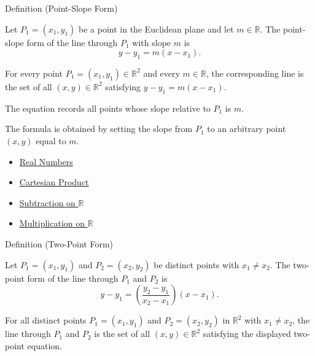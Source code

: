 \begin{definitionbox}{Definition (Point-Slope Form)}
\begin{definition}\label{def:point-slope-form}
Let $P_1=(x_1,y_1)$ be a point in the Euclidean plane and let
$m\in\mathbb{R}$. The point-slope form of the line through $P_1$ with slope
$m$ is
\[
  y-y_1=m(x-x_1).
\]
\end{definition}
\end{definitionbox}

\begin{remark*}
For every point $P_1=(x_1,y_1)\in\mathbb{R}^2$ and every
$m\in\mathbb{R}$, the corresponding line is the set of all
$(x,y)\in\mathbb{R}^2$ satisfying $y-y_1=m(x-x_1)$.
\end{remark*}

\begin{remark*}[Interpretation]
The equation records all points whose slope relative to $P_1$ is $m$.
\end{remark*}

\begin{remark*}[Exposition]
The formula is obtained by setting the slope from $P_1$ to an arbitrary point
$(x,y)$ equal to $m$.
\end{remark*}

\begin{dependencies}
\begin{itemize}
  \item \hyperref[def:reals]{Real Numbers}
  \item \hyperref[def:cartesian-product]{Cartesian Product}
  \item \hyperref[def:subtraction-on-r]{Subtraction on $\mathbb{R}$}
  \item \hyperref[def:multiplication-on-r]{Multiplication on $\mathbb{R}$}
\end{itemize}
\end{dependencies}

\begin{definitionbox}{Definition (Two-Point Form)}
\begin{definition}\label{def:two-point-form}
Let $P_1=(x_1,y_1)$ and $P_2=(x_2,y_2)$ be distinct points with
$x_1\neq x_2$. The two-point form of the line through $P_1$ and $P_2$ is
\[
  y-y_1=\left(\frac{y_2-y_1}{x_2-x_1}\right)(x-x_1).
\]
\end{definition}
\end{definitionbox}

\begin{remark*}
For all distinct points $P_1=(x_1,y_1)$ and $P_2=(x_2,y_2)$ in
$\mathbb{R}^2$ with $x_1\neq x_2$, the line through $P_1$ and $P_2$ is the set
of all $(x,y)\in\mathbb{R}^2$ satisfying the displayed two-point equation.
\end{remark*}

